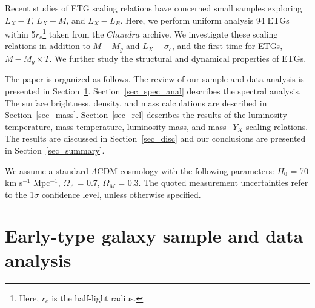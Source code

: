 \documentclass[iop]{emulateapj}
\begin{document}
Recent studies of ETG scaling relations have concerned small samples exploring $L_X-T$, $L_X-M$, and $L_X-L_B$. Here, we perform uniform analysis 94 ETGs within 5$r_e$\footnote{Here, $r_e$ is the half-light radius.} taken from the $Chandra$ archive.
We investigate these scaling relations in addition to $M-M_g$ and $L_X-\sigma_c$, and the first time for ETGs, $M-M_g \times T$. We further study the structural and dynamical properties of ETGs.

The paper is organized as follows. The review of our sample and data analysis is presented in Section~\ref{sec:2}. Section~\ref{sec_spec_anal} describes the spectral analysis. The surface brightness, density, and mass calculations are described in Section~\ref{sec_mass}. Section~\ref{sec_rel} describes the results of the luminosity-temperature, mass-temperature, luminosity-mass, and mass$-Y_X$ scaling relations. The results are discussed in Section~\ref{sec_disc} and our conclusions are presented in Section~\ref{sec_summary}.

We assume a standard $\Lambda$CDM cosmology with the following parameters: $H_0$ = 70 km s$^{-1}$ Mpc$^{-1}$, $\Omega_{\Lambda}$ = 0.7, $\Omega_{M}$ = 0.3. The quoted measurement uncertainties refer to the 1$\sigma$ confidence level, unless otherwise specified. 

\section{Early-type galaxy sample and data analysis}\label{sec:2}
\end{document}

